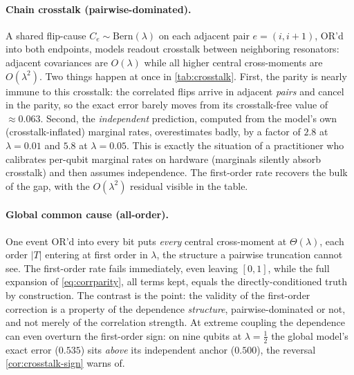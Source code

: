 \documentclass[12pt]{article}
\numberwithin{equation}{section}
\theoremstyle{plain}
\theoremstyle{definition}
\theoremstyle{remark}
\begin{document}
\paragraph{Chain crosstalk (pairwise-dominated).} A shared flip-cause
$C_e\sim\mathrm{Bern}(\lambda)$ on each adjacent pair $e=(i,i+1)$, OR'd into
both endpoints, models readout crosstalk between neighboring resonators:
adjacent covariances are $O(\lambda)$ while all higher central cross-moments
are $O(\lambda^2)$. Two things happen at once in \cref{tab:crosstalk}. First,
the parity is nearly immune to this crosstalk: the correlated flips arrive in
adjacent \emph{pairs} and cancel in the parity, so the exact error barely moves
from its crosstalk-free value of $\approx0.063$. Second, the \emph{independent}
prediction, computed from the model's own (crosstalk-inflated) marginal rates,
overestimates badly, by a factor of $2.8$ at $\lambda=0.01$ and $5.8$ at
$\lambda=0.05$. This is exactly the situation of a practitioner who calibrates
per-qubit marginal rates on hardware (marginals silently absorb crosstalk) and
then assumes independence. The first-order rate recovers the bulk of the gap,
with the $O(\lambda^2)$ residual visible in the table.

\paragraph{Global common cause (all-order).} One event OR'd into every bit
puts \emph{every} central cross-moment at $\Theta(\lambda)$, each order $|T|$
entering at first order in $\lambda$, the structure a pairwise truncation
cannot see.
The first-order rate fails immediately, even leaving $[0,1]$, while the full
expansion of \cref{eq:corrparity}, all terms kept, equals the
directly-conditioned truth by construction. The contrast is the point: the
validity of the first-order correction is a property of the dependence
\emph{structure}, pairwise-dominated or not, and not merely of the correlation
strength. At extreme coupling the dependence can even overturn the first-order
sign: on nine qubits at $\lambda=\tfrac12$ the global model's exact error
($0.535$) sits \emph{above} its independent anchor ($0.500$), the reversal
\cref{cor:crosstalk-sign} warns of.
\end{document}
